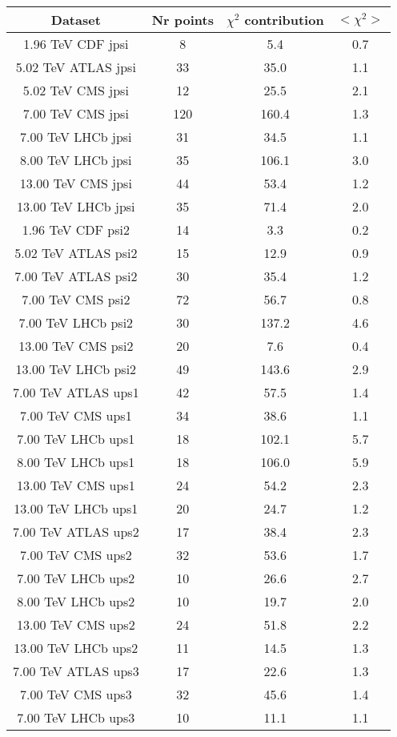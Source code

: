 \begin{table}[h!]
\centering
\begin{tabular}{c|c|c|c}
Dataset & Nr points & $\chi^2$ contribution & $<\chi^2>$ \\
\hline
1.96 TeV CDF jpsi & 8 & 5.4 & 0.7 \\
5.02 TeV ATLAS jpsi & 33 & 35.0 & 1.1 \\
5.02 TeV CMS jpsi & 12 & 25.5 & 2.1 \\
7.00 TeV CMS jpsi & 120 & 160.4 & 1.3 \\
7.00 TeV LHCb jpsi & 31 & 34.5 & 1.1 \\
8.00 TeV LHCb jpsi & 35 & 106.1 & 3.0 \\
13.00 TeV CMS jpsi & 44 & 53.4 & 1.2 \\
13.00 TeV LHCb jpsi & 35 & 71.4 & 2.0 \\
1.96 TeV CDF psi2 & 14 & 3.3 & 0.2 \\
5.02 TeV ATLAS psi2 & 15 & 12.9 & 0.9 \\
7.00 TeV ATLAS psi2 & 30 & 35.4 & 1.2 \\
7.00 TeV CMS psi2 & 72 & 56.7 & 0.8 \\
7.00 TeV LHCb psi2 & 30 & 137.2 & 4.6 \\
13.00 TeV CMS psi2 & 20 & 7.6 & 0.4 \\
13.00 TeV LHCb psi2 & 49 & 143.6 & 2.9 \\
7.00 TeV ATLAS ups1 & 42 & 57.5 & 1.4 \\
7.00 TeV CMS ups1 & 34 & 38.6 & 1.1 \\
7.00 TeV LHCb ups1 & 18 & 102.1 & 5.7 \\
8.00 TeV LHCb ups1 & 18 & 106.0 & 5.9 \\
13.00 TeV CMS ups1 & 24 & 54.2 & 2.3 \\
13.00 TeV LHCb ups1 & 20 & 24.7 & 1.2 \\
7.00 TeV ATLAS ups2 & 17 & 38.4 & 2.3 \\
7.00 TeV CMS ups2 & 32 & 53.6 & 1.7 \\
7.00 TeV LHCb ups2 & 10 & 26.6 & 2.7 \\
8.00 TeV LHCb ups2 & 10 & 19.7 & 2.0 \\
13.00 TeV CMS ups2 & 24 & 51.8 & 2.2 \\
13.00 TeV LHCb ups2 & 11 & 14.5 & 1.3 \\
7.00 TeV ATLAS ups3 & 17 & 22.6 & 1.3 \\
7.00 TeV CMS ups3 & 32 & 45.6 & 1.4 \\
7.00 TeV LHCb ups3 & 10 & 11.1 & 1.1 \\

\end{tabular}
\end{table}
